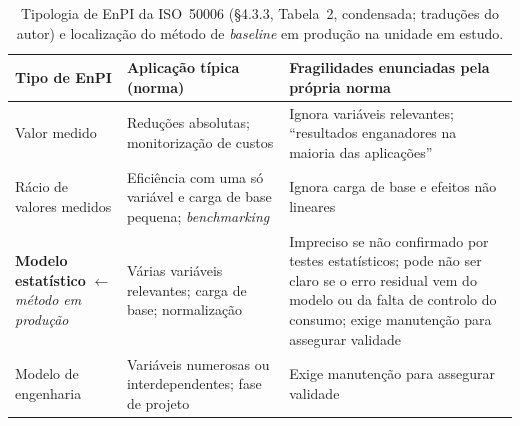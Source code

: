 \begin{table}[htbp]
  \centering\footnotesize
  \caption[Tipologia de EnPI da ISO 50006 e localização do método em produção]{Tipologia de EnPI da ISO~50006 (\S4.3.3, Tabela~2, condensada; traduções do autor) e localização do método de \emph{baseline} em produção na unidade em estudo.}
  \label{tab:tipologia-enpi}
  \begin{tabularx}{\textwidth}{@{}l X X@{}}
    \toprule
    \textbf{Tipo de EnPI} & \textbf{Aplicação típica (norma)} & \textbf{Fragilidades enunciadas pela própria norma} \\
    \midrule
    Valor medido & Reduções absolutas; monitorização de custos & Ignora variáveis relevantes; \enquote{resultados enganadores na maioria das aplicações} \\
    \addlinespace
    Rácio de valores medidos & Eficiência com uma só variável e carga de base pequena; \emph{benchmarking} & Ignora carga de base e efeitos não lineares \\
    \addlinespace
    \textbf{Modelo estatístico} $\leftarrow$ \emph{método em produção} & Várias variáveis relevantes; carga de base; normalização & Impreciso se não confirmado por testes estatísticos; pode não ser claro se o erro residual vem do modelo ou da falta de controlo do consumo; exige manutenção para assegurar validade \\
    \addlinespace
    Modelo de engenharia & Variáveis numerosas ou interdependentes; fase de projeto & Exige manutenção para assegurar validade \\
    \bottomrule
  \end{tabularx}
\end{table}

